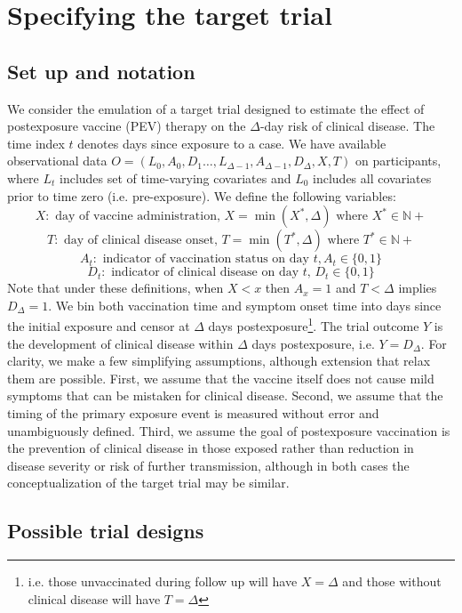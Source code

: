 \documentclass[11pt]{article}
\begin{document}

\section{Specifying the target trial}

\subsection{Set up and notation} \label{sec:setup}
We consider the emulation of a target trial designed to estimate the effect of postexposure vaccine (PEV) therapy on the $\Delta$-day risk of clinical disease. The time index $t$ denotes days since exposure to a case. We have available observational data $O=\left(L_0, A_0, D_1 \ldots, L_{\Delta-1}, A_{\Delta-1}, D_{\Delta}, X, T\right)$ on participants, where $L_t$ includes set of time-varying covariates and $L_0$ includes all covariates prior to time zero (i.e. pre-exposure). We define the following variables:
$$X: \text{ day of vaccine administration, } X = \operatorname{min}(X^*, \Delta) \text{ where } X^* \in \mathbb{N}+$$
$$T: \text{ day of clinical disease onset, } T = \operatorname{min}(T^*, \Delta) \text{ where } T^* \in \mathbb{N}+$$
$$A_t: \text{ indicator of vaccination status on day }t, A_t \in \{0, 1\}$$
$$D_t: \text{ indicator of clinical disease on day $t$, } D_t \in \{0, 1\}$$
Note that under these definitions, when $X < x$ then $A_x = 1$ and $T < \Delta$ implies $D_{\Delta} = 1$. We bin both vaccination time and symptom onset time into days since the initial exposure and censor at $\Delta$ days postexposure\footnote{i.e. those unvaccinated during follow up will have $X = \Delta$ and those without clinical disease will have $T = \Delta$}. The trial outcome $Y$ is the development of clinical disease within $\Delta$ days postexposure, i.e. $Y=D_{\Delta}$. For clarity, we make a few simplifying assumptions, although extension that relax them are possible. First, we assume that the vaccine itself does not cause mild symptoms that can be mistaken for clinical disease. Second, we assume that the timing of the primary exposure event is measured without error and unambiguously defined. Third, we assume the goal of postexposure vaccination is the prevention of clinical disease in those exposed rather than reduction in disease severity or risk of further transmission, although in both cases the conceptualization of the target trial may be similar.

\subsection{Possible trial designs}
\end{document}
